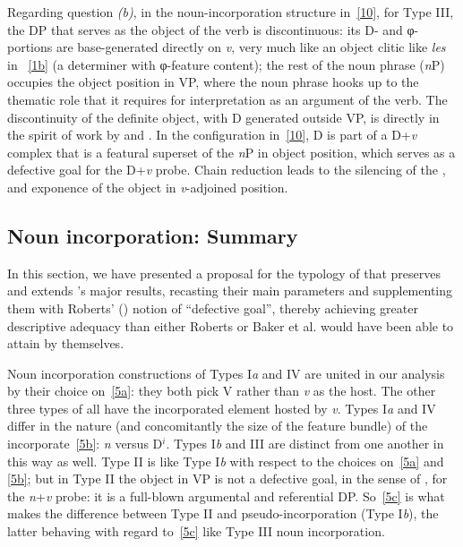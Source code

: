 \documentclass[output=paper]{langsci/langscibook}
\newcommand{\posscite}[1]{\citeauthor{#1}'s \citeyearpar{#1}}
\begin{document}
\begin{refcontext}
Regarding question \emph{(b)}, in the noun-incorporation structure
in~\eqref{10}, for Type III, the DP that serves as the object of the verb is
discontinuous: its D- and φ{}-portions are base-generated directly on \emph{v},
very much like an object clitic like \emph{les} in ~\eqref{1b} (a
determiner with φ-feature content); the rest of the noun phrase (\emph{n}P)
occupies the object position in VP, where the noun phrase hooks up to the
thematic role that it requires for interpretation as an argument of the verb.
The discontinuity of the definite object, with D generated outside VP, is
directly in the spirit of work by \cite{sportiche98} and \cite{lin00}. In the
configuration in~\eqref{10}, D is part of a D+\emph{v} complex that is a
featural superset of the \emph{n}P in object position, which serves as a
defective goal for the D+\emph{v} probe.  Chain reduction leads to the
silencing of the , and exponence of the object in
\emph{v}-adjoined position.

\subsection{Noun incorporation: Summary}
In this section, we have presented a proposal for the typology of  that preserves
and extends \posscite{bakeretal05} major results, recasting their main parameters and supplementing
them with Roberts' (\citeyear{Roberts2010}) notion of \enquote{defective goal}, thereby achieving greater descriptive adequacy
than either Roberts or Baker et al. would have been able to attain by themselves.

Noun incorporation constructions of Types I\emph{a} and IV are united in our
analysis by their choice on~\eqref{5a}: they both pick V rather than \emph{v} as
the host. The other three types of  all have the incorporated
element hosted by \emph{v}. Types I\emph{a} and IV differ in the nature (and
concomitantly the size of the feature bundle) of the incorporate~\eqref{5b}:
\emph{n} versus D$^i$. Types I\emph{b} and III are distinct from one another in
this way as well. Type II is like Type I\emph{b} with respect to the choices
on~\eqref{5a} and \eqref{5b}; but in Type II the object in VP is not a defective
goal, in the sense of \cite{Roberts2010}, for the \emph{n}+\emph{v} probe: it is
a full-blown argumental and referential DP. So~\eqref{5c} is what makes the
difference between Type II  and pseudo-incorporation (Type
I\emph{b}), the latter behaving with regard to~\eqref{5c} like Type III noun
incorporation.


\end{refcontext}
\end{document}
